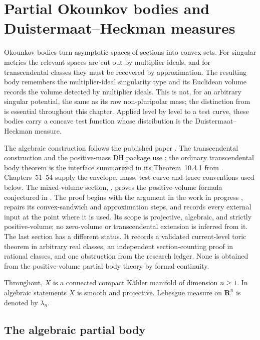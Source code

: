 \chapter{Partial Okounkov bodies and Duistermaat--Heckman measures}
\label{chap:transcendental-okounkov-dh}

Okounkov bodies turn asymptotic spaces of sections into convex sets.
For singular metrics the relevant spaces are cut out by multiplier ideals,
and for transcendental classes they must be recovered by approximation.
The resulting body remembers the multiplier-ideal singularity type and its
Euclidean volume records the volume detected by multiplier ideals.  This is
not, for an arbitrary singular potential, the same as its raw
non-pluripolar mass; the distinction from 
is essential throughout this chapter.
Applied level by level to a test curve, these bodies carry a concave test
function whose distribution is the Duistermaat--Heckman measure.

The algebraic construction follows the published paper \cite{Xia21}.
The transcendental construction and the positive-mass DH package use
\cite[Sections~10.4--10.5 and~13.3]{XiaBook}; the ordinary transcendental
body theorem is the interface summarized in its Theorem~10.4.1 from
\cite{DRWNXZ}.  Chapters~51--54 supply the envelope, mass, test-curve
and trace conventions used below.
The mixed-volume section, , proves
the positive-volume formula conjectured in \cite[Conjecture~8.8]{Xia21}.
The proof begins with the argument in the work in progress \cite{XiaMVOB},
repairs its convex-sandwich and approximation steps, and records every
external input at the point where it is used.  Its scope is projective,
algebraic, and strictly positive-volume; no zero-volume or transcendental
extension is inferred from it.
The last section has a different status.
It records a validated current-level toric theorem in arbitrary real classes,
an independent section-counting proof in rational classes, and one obstruction
from the research ledger.  None is obtained from the positive-volume partial
body theory by formal continuity.

Throughout, $X$ is a connected compact K\"ahler manifold of dimension
$n\geq1$.
In algebraic statements $X$ is smooth and projective.
Lebesgue measure on $\mathbf R^n$ is denoted by $\lambda_n$.

\section{The algebraic partial body}
\label{sec:ok-algebraic-body}

